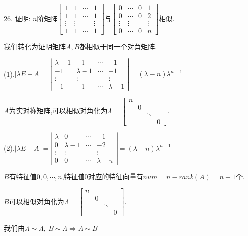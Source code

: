 26. 证明:  $n$阶矩阵$\left[ \begin{matrix}
	1&1&\cdots&1\\
	1&1&\cdots&1\\
	\vdots&\vdots& &\vdots\\
	1&1&\cdots&1
\end{matrix}\right] $与$\left[ \begin{matrix}
0&\cdots&0&1\\
0&\cdots&0&2\\
\vdots&\vdots& &\vdots\\
0&\cdots&0&n
\end{matrix}\right] $相似.
\begin{solution}
	
	我们转化为证明矩阵$A,B$都相似于同一个对角矩阵.
	
	(1).$|\lambda E-A|=\left|  \begin{matrix}
		\lambda-1&-1&\cdots&-1\\
		-1&\lambda-1&\cdots&-1\\
		\vdots&\vdots& &\vdots\\
		-1&-1&\cdots&\lambda-1
	\end{matrix}\right|=(\lambda-n)\lambda^{n-1}$
	
	$A$为实对称矩阵,可以相似对角化为$\varLambda=\left[ \begin{matrix}
		n& & & \\
		 &0& & \\
		 & &\ddots&\\
		 & & & 0
	\end{matrix}\right] $.

	(2).$|\lambda E-A|=\left|  \begin{matrix}
		\lambda&0&\cdots&-1\\
		0&\lambda-1&\cdots&-2\\
		\vdots&\vdots& &\vdots\\
		0&0&\cdots&\lambda-n
	\end{matrix}\right|=(\lambda-n)\lambda^{n-1}$
	
	$B$有特征值$0,0,\cdots,n$,特征值$0$对应的特征向量有$num=n-rank(A)=n-1$个.
	
	$B$可以相似对角化为$\varLambda=\left[ \begin{matrix}
		n& & & \\
		&0& & \\
		& &\ddots&\\
		& & & 0
	\end{matrix}\right] $.

	我们由$A\sim \varLambda,\ B\sim \varLambda\Rightarrow A\sim B$
\end{solution}

